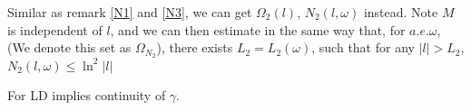 \begin{remark}\label{N2}
  Similar as remark \ref{N1} and \ref{N3}, we can get $\Omega_2(l)$, $N_2(l,\omega)$ instead. Note $M$ is independent of $l$, and we can then estimate in the same way that, for $a.e.\omega$, (We denote this set as $\Omega_{N_2}$), there exists $L_2=L_2(\omega)$, such that for any $|l|>L_2$, $N_2(l,\omega)\leq \ln^2 |l|$
\end{remark}
\begin{remark}
  For LD implies continuity of $\gamma$.
\end{remark}
